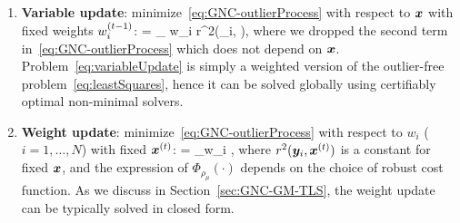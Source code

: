 \begin{enumerate}
\item {\bf Variable update}: minimize~\eqref{eq:GNC-outlierProcess} with respect to ${\bm x}$ with fixed weights $w^{(t-1)}_i$:
\bea \label{eq:variableUpdate}
\vxx{} = \argmin_{\vxx \in \calX} \sumAllPointsi w_i r^2(\vy_i, \vxx),
\eea
where we dropped the second term in~\eqref{eq:GNC-outlierProcess} which does not depend on ${\bm x}$. 
Problem~\eqref{eq:variableUpdate} is simply a weighted version of the outlier-free problem~\eqref{eq:leastSquares}, 
 hence it can be solved globally using certifiably optimal non-minimal solvers.  

\item {\bf Weight update}: minimize~\eqref{eq:GNC-outlierProcess} with respect to $w_i$ ($i=1,\ldots,N$) 
with fixed ${\bm x}^{(t)}$:
\bea \label{eq:weightUpdate}
\vw{} = \argmin_{w_i \in [0,1]} \sumAllPointsi {},
\eea
where $r^2({\bm y}_i, {\bm x}^{(t)})$ is a constant for fixed ${\bm x}$, and the expression of $\Phi_{\rho_\mu}(\cdot)$ depends on the choice of robust cost function. As we discuss in Section~\ref{sec:GNC-GM-TLS}, the weight update can be typically solved in closed form. 
\end{enumerate}

